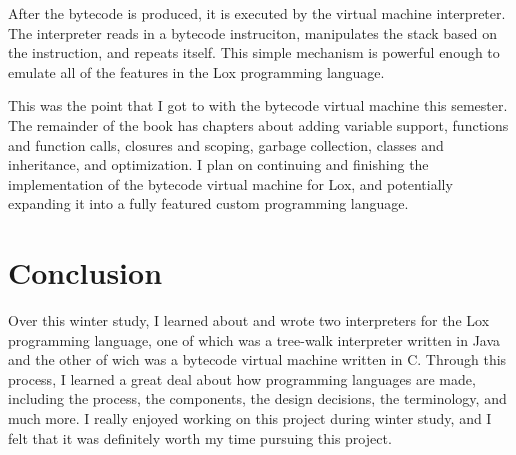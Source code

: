 \documentclass[tikz]{article}
\renewcommand{\:}{\colon}
\begin{document}
After the bytecode is produced, it is executed by the virtual machine interpreter. The interpreter reads in a bytecode instruciton, manipulates the stack based on the instruction, and repeats itself. This simple mechanism is powerful enough to emulate all of the features in the Lox programming language.

This was the point that I got to with the bytecode virtual machine this semester. The remainder of the book has chapters about adding variable support, functions and function calls, closures and scoping, garbage collection, classes and inheritance, and optimization. I plan on continuing and finishing the implementation of the bytecode virtual machine for Lox, and potentially expanding it into a fully featured custom programming language.

\section*{Conclusion}
Over this winter study, I learned about and wrote two interpreters for the Lox programming language, one of which was a tree-walk interpreter written in Java and the other of wich was a bytecode virtual machine written in C. Through this process, I learned a great deal about how programming languages are made, including the process, the components, the design decisions, the terminology, and much more. I really enjoyed working on this project during winter study, and I felt that it was definitely worth my time pursuing this project.
\end{document}
